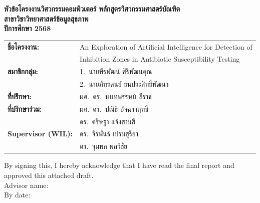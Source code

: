 \documentclass[12pt,a4paper,oneside]{report}
\begin{document}
\begin{titlepage}
  \thispagestyle{empty}
  \centering

  {\large\bfseries หัวข้อโครงงานวิศวกรรมคอมพิวเตอร์ หลักสูตรวิศวกรรมศาสตร์บัณฑิต}\\[0.1cm]
  {\large\bfseries สาขาวิชาวิทยาศาสตร์ข้อมูลสุขภาพ}\\[0.1cm]
  {\large\bfseries ปีการศึกษา 2568}\\[1.2cm]

  \begin{tabular}{@{}lp{10cm}@{}}
    \textbf{ชื่อโครงงาน:} &
      An Exploration of Artificial Intelligence for Detection of \\
    & Inhibition Zones in Antibiotic Susceptibility Testing \\[0.8cm]
    \textbf{สมาชิกกลุ่ม:} &
      1.\ นายพีรพัฒน์ ศิริพัฒนคุณ \quad 65070505214\\[0.2cm]
    & 2.\ นายภัทรดนย์ ธนประสิทธิ์พัฒนา \quad 65070505223 \\[0.8cm]
    \textbf{ที่ปรึกษา:}    & ผศ.\ ดร.\ นนทพรรษน์ ลีราช \\[0.3cm]
    \textbf{ที่ปรึกษาร่วม:} & ผศ.\ ดร.\ ปณิธิ อัจฉราฤทธิ์ \\[0.2cm]
    & ดร.\ คริษฐา แจ้งสามสี \\[0.3cm]
    \textbf{Supervisor (WIL):} & ดร.\ จิรพันธ์ เปรมสุริยา \\[0.2cm]
    & ดร.\ จุมพล พลวิชัย \\[1.5cm]
  \end{tabular}

  \vfill
  \begin{flushleft}
  By signing this, I hereby acknowledge that I have read the final report
  and approved this attached draft.\\[1.8cm]
  Advisor name:\ \underline{\hspace{8cm}}\\[1cm]
  By date:\ \underline{\hspace{8.7cm}}
  \end{flushleft}
\end{titlepage}
\end{document}
